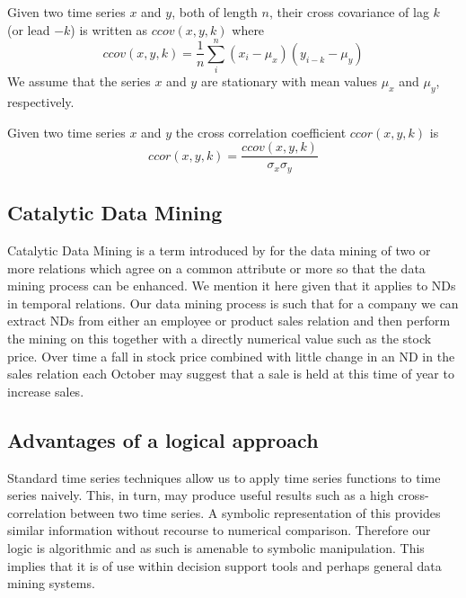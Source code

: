 \begin{definition}\label{def:crosscovar}
\begin{rm}
Given two time series $x$ and $y$, both of length $n$, their
cross covariance of lag $k$
(or lead $-k$) is written as $ccov(x,y,k)$ where
\[
ccov(x,y,k) = \frac{1}{n} \sum_i^n (x_i - \mu_x) (y_{i-k} - \mu_y)
\]
We assume that the series $x$ and $y$ are stationary with mean values
$\mu_x$ and $\mu_y$, respectively.
\end{rm}
\end{definition}
 
\begin{definition}\label{def:crosscorrel}
\begin{rm}
Given two time series $x$ and $y$ the cross correlation coefficient $ccor(x,y,k)
$ is
\[
ccor(x,y,k) = \frac{ccov(x,y,k)}{\sigma_x \sigma_y}
\]
\end{rm}
\end{definition}

\subsection{Catalytic Data Mining}\label{subsec:tl_catdm}

Catalytic Data Mining is a term introduced by \cite{HS95} for the data
mining of two or more relations which agree on a common attribute or
more so that the data mining process can be enhanced. We mention it
here given that it applies to NDs in temporal relations. Our data
mining process is such that for a company we can extract NDs from
either an employee or product sales relation and 
then perform the mining on this together with a directly numerical
value such as the stock price. Over time a fall in stock price
combined with little change in an ND in the sales relation each
October may suggest that a sale is held at this time of year to
increase sales.

\subsection{Advantages of a logical approach}


Standard time series techniques allow us to apply time series functions
to time series naively. This, in turn, may produce useful results such
as a high cross-correlation between two time series. A symbolic
representation of this provides similar information without recourse
to numerical comparison. Therefore our logic is algorithmic and
as such is amenable to symbolic manipulation. This implies that it is
of use within decision support tools and perhaps general data mining
systems.


